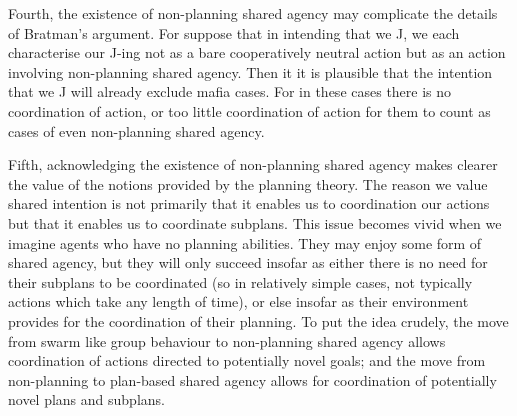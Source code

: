 \documentclass[12pt,letterpaper]{extarticle}
\begin{document}
Fourth, the existence of non-planning shared agency may complicate the details of Bratman's argument.
For suppose that in intending that we J, we each characterise our J-ing not as a bare cooperatively neutral action but as an action involving non-planning shared agency.
Then it it is plausible that the intention that we J will already exclude mafia cases.
For in these cases there is no coordination of action, or too little coordination of action for them to count as cases of even non-planning shared agency.

Fifth, acknowledging the existence of non-planning shared agency makes clearer the value of the notions provided by the planning theory.
The reason we value shared intention is not primarily that it enables us to coordination our actions but that it enables us to coordinate subplans.
This issue becomes vivid when we imagine agents who have no planning abilities.
They may enjoy some form of shared agency, but they will only succeed insofar as either there is no need for their subplans to be coordinated (so in relatively simple cases, not typically actions which take any length of time), or else insofar as their environment provides for the coordination of their planning.
To put the idea crudely, the move from swarm like group behaviour to non-planning shared agency allows coordination of actions directed to potentially novel goals; and the move from non-planning to plan-based shared agency allows for coordination of potentially novel plans and subplans.





\small

\end{document}

